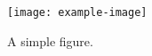 \begin{figure}[thb] \centering
    \texttt{[image: example-image]}
    \caption{A simple figure.} \label{fig:figure1}
\end{figure}
